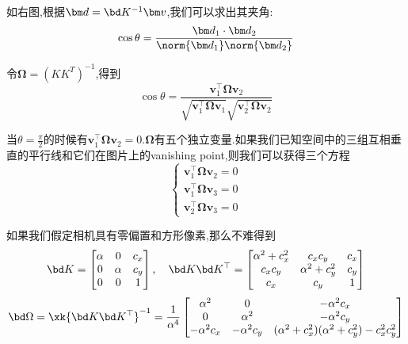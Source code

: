 如右图,根据$\bm d = \bd K^{-1} \bm v$,我们可以求出其夹角:
\begin{equation}
	\cos \theta = \frac{\bm d_1 \cdot \bm d_2}{\norm{\bm d_1} \norm{\bm d_2}}
\end{equation}



令$\bm \Omega =\left(K K^{T}\right)^{-1}$,得到
\begin{equation}
	\cos \theta=\frac{\bm{v}_{1}^{\top} \bm \Omega \bm{v}_{2}}{\sqrt{\bm{v}_{1}^{\top} \bm \Omega \bm{v}_{1}} \sqrt{\bm{v}_{2}^{\top} \bm \Omega \bm{v}_{2}}}  
\end{equation}

当$\theta = \frac{\pi}{2}$的时候有$\bm{v}_{1}^{\top} \bm \Omega \bm{v}_{2} = 0$.$\bm \Omega$有五个独立变量.如果我们已知空间中的三组互相垂直的平行线和它们在图片上的vanishing point,则我们可以获得三个方程
\begin{equation}
	\begin{cases}
		\bm{v}_{1}^{\top} \bm \Omega \bm{v}_{2} = 0
		\\
		\bm{v}_{1}^{\top} \bm \Omega \bm{v}_{3} = 0
		\\
		\bm{v}_{2}^{\top} \bm \Omega \bm{v}_{3} = 0
	\end{cases}
\end{equation}

如果我们假定相机具有零偏置和方形像素,那么不难得到
\begin{equation}
	\bd K = 
	\begin{bmatrix}
		\alpha & 0 & c_x
		\\ 
		0 & \alpha & c_y
		\\
		0 & 0 & 1
	\end{bmatrix}, \quad
	\bd K \bd K^{\top} = 
	\begin{bmatrix}
		\alpha^2 + c_x^2 & c_x c_y & c_x
		\\
		c_x c_y & \alpha^2 + c_y^2 & c_y
		\\
		c_x & c_y & 1
	\end{bmatrix}
\end{equation}
\begin{equation}
	\bd \Omega = \xk{\bd K \bd K^{\top}}^{-1} = \frac{1}{\alpha^4}
	\begin{bmatrix}
		\alpha^2 & 0 & -\alpha^2 c_x
		\\
		0 & \alpha^2 & -\alpha^2 c_y
		\\
		-\alpha^2 c_x & -\alpha^2 c_y & (\alpha^2 + c_x^2)(\alpha^2 + c_y^2) - c_x^2 c_y^2
	\end{bmatrix}
\end{equation}

